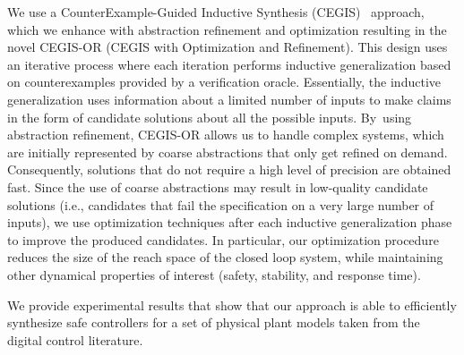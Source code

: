 \documentclass[sigconf]{llncs}
\begin{document}
We use a CounterExample-Guided Inductive Synthesis (CEGIS)~\cite{jha-icse10,
DBLP:conf/pldi/Solar-LezamaRBE05} approach, which we enhance with
abstraction refinement and optimization resulting in the novel CEGIS-OR
(CEGIS with Optimization and Refinement).  This design uses an iterative
process where each iteration performs inductive generalization based on
counterexamples provided by a verification oracle.  Essentially, the
inductive generalization uses information about a limited number of inputs
to make claims in the form of candidate solutions about all the possible
inputs.  By~using abstraction refinement, CEGIS-OR allows us to handle
complex systems, which are initially represented by coarse abstractions that
only get refined on demand.  Consequently, solutions that do not require a
high level of precision are obtained fast.  Since the use of coarse
abstractions may result in low-quality candidate solutions (i.e., candidates
that fail the specification on a very large number of inputs), we use
optimization techniques after each inductive generalization phase to improve
the produced candidates.  In particular, our optimization procedure reduces
the size of the reach space of the closed loop system, while maintaining
other dynamical properties of interest (safety, stability, and response
time).



We provide experimental results that show that our approach is able to
efficiently synthesize safe controllers for a set of physical plant models
taken from the digital control literature.
\end{document}
